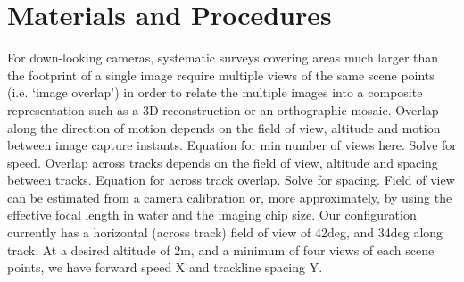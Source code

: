 \section{Materials and Procedures}


For down-looking cameras, systematic surveys covering areas much larger than the footprint of a single image require multiple views of the same scene points (i.e. `image overlap') in order to relate the multiple images into a composite representation such as a 3D reconstruction or an orthographic mosaic. Overlap along the direction of motion depends on the field of view, altitude and motion between image capture instants. Equation for min number of views here. Solve for speed.
Overlap across tracks depends on the field of view, altitude and spacing between tracks. 
Equation for across track overlap. Solve for spacing.
Field of view can be estimated from a camera calibration or, more approximately, by using the effective focal length in water and the imaging chip size. Our configuration currently has a horizontal (across track) field of view of 42deg, and 34deg along track. At a desired altitude of 2m, and a minimum of four views of each scene points, we have forward speed X and trackline spacing Y. 


